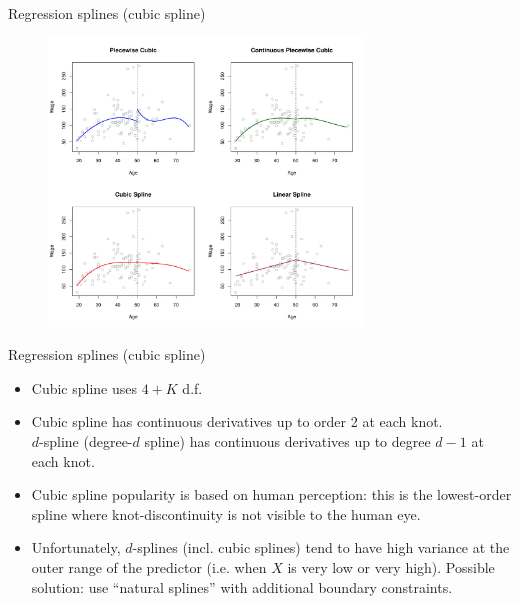 \documentclass{beamer}
\begin{document}
\begin{frame}{Regression splines (cubic spline)}
\centering
\vspace{-0.2cm}
\begin{figure}
  \centering
  \includegraphics[trim=0cm 0cm 0cm 0cm, clip=true, width=0.75\textwidth]{IMG/ISLR73.pdf}
\end{figure}
\end{frame}
\begin{frame}{Regression splines (cubic spline)}
\begin{itemize}
    \item Cubic spline uses $4+K$ d.f.
    \smallskip
    \item Cubic spline has continuous derivatives up to order 2 at each knot.\\
    $d$-spline (degree-$d$ spline) has continuous derivatives up to degree $d-1$ at each knot.
    \smallskip
    \item Cubic spline popularity is based on human perception: this is the lowest-order spline where knot-discontinuity is not visible to the human eye.
    \smallskip
    \item Unfortunately, $d$-splines (incl. cubic splines) tend to have high variance at the outer range of the predictor (i.e. when $X$ is very low or very high). Possible solution: use ``natural splines'' with additional boundary constraints.
\end{itemize}
\end{frame}
\end{document}
